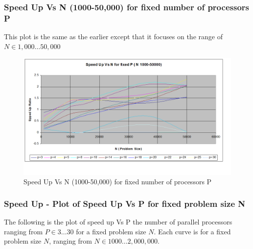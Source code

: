 \documentclass[twoside,11pt]{article}\usepackage{amsmath,amsfonts,amsthm,fullpage}
\begin{document}
\subsubsection{Speed Up Vs N (1000-50,000) for fixed number of processors P}

This plot is the same as the earlier except that it focuses on the range of  $N \in 1,000 \dots 50,000$
\begin{figure}[!htbp]
\centering
\includegraphics[scale=.46]{charts/p-n-speedup-1000-50000} 
\caption{Speed Up Vs N (1000-50,000) for fixed number of processors P}
\label{Speed Up Vs N (1000-50000) for fixed number of processors}
\end{figure}


\pagebreak
\subsubsection{Speed Up - Plot of Speed Up Vs P for fixed problem size N}
The following is the plot of speed up Vs P the number of parallel processors ranging from  $P \in 3 \dots 30$ for a fixed problem size $N$. Each curve is for a fixed problem size $N$, ranging from  $N \in 1000 \dots 2,000,000$.
\end{document}
